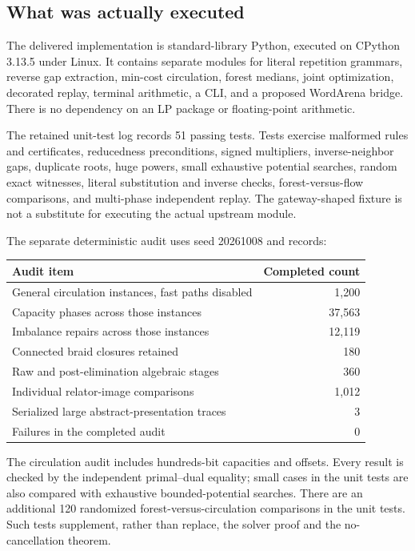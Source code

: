 \documentclass[11pt,letterpaper]{article}
\theoremstyle{definition}
\theoremstyle{remark}\newtheorem{remark}[theorem]{Remark}
\begin{document}
\subsection{What was actually executed}

The delivered implementation is standard-library Python, executed on
CPython 3.13.5 under Linux. It contains separate modules for literal repetition
grammars, reverse gap extraction, min-cost circulation, forest medians, joint
optimization, decorated replay, terminal arithmetic, a CLI, and a proposed
WordArena bridge. There is no dependency on an LP package or floating-point
arithmetic.

The retained unit-test log records 51 passing tests. Tests exercise malformed
rules and certificates, reducedness preconditions, signed multipliers,
inverse-neighbor gaps, duplicate roots, huge powers, small exhaustive
potential searches, random exact witnesses, literal substitution and inverse
checks, forest-versus-flow comparisons, and multi-phase independent replay.
The gateway-shaped fixture is not a substitute for executing the actual
upstream module.

The separate deterministic audit uses seed 20261008 and records:
\begin{center}
\begin{tabular}{lr}
\toprule
Audit item & Completed count\\
\midrule
General circulation instances, fast paths disabled & 1,200\\
Capacity phases across those instances & 37,563\\
Imbalance repairs across those instances & 12,119\\
Connected braid closures retained & 180\\
Raw and post-elimination algebraic stages & 360\\
Individual relator-image comparisons & 1,012\\
Serialized large abstract-presentation traces & 3\\
Failures in the completed audit & 0\\
\bottomrule
\end{tabular}
\end{center}

The circulation audit includes hundreds-bit capacities and offsets. Every
result is checked by the independent primal--dual equality; small cases in
the unit tests are also compared with exhaustive bounded-potential searches.
There are an additional 120 randomized forest-versus-circulation comparisons
in the unit tests. Such tests supplement, rather than replace, the solver
proof and the no-cancellation theorem.
\end{document}
